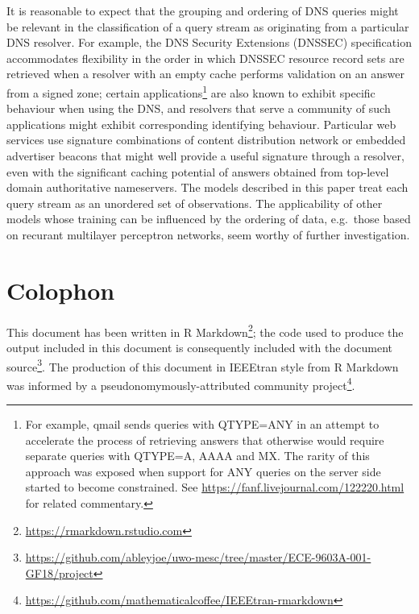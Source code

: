 \documentclass[conference]{IEEEtran}
\begin{document}
It is reasonable to expect that the grouping and ordering of DNS queries
might be relevant in the classification of a query stream as originating
from a particular DNS resolver. For example, the DNS Security Extensions
(DNSSEC) specification\cite{rfc4033} accommodates flexibility in the
order in which DNSSEC resource record sets are retrieved when a resolver
with an empty cache performs validation on an answer from a signed zone;
certain
applications\footnote{For example, qmail sends queries with QTYPE=ANY in an attempt to accelerate the process of retrieving answers that otherwise would require separate queries with QTYPE=A, AAAA and MX. The rarity of this approach was exposed when support for ANY queries on the server side started to become constrained. See \url{https://fanf.livejournal.com/122220.html} for related commentary.}
are also known to exhibit specific behaviour when using the DNS, and
resolvers that serve a community of such applications might exhibit
corresponding identifying behaviour. Particular web services use
signature combinations of content distribution network or embedded
advertiser beacons that might well provide a useful signature through a
resolver, even with the significant caching potential of answers
obtained from top-level domain authoritative nameservers. The models
described in this paper treat each query stream as an unordered set of
observations. The applicability of other models whose training can be
influenced by the ordering of data, e.g.~those based on recurant
multilayer perceptron networks, seem worthy of further investigation.

\section{Colophon}\label{sec:colophon}

\label{sec:colophon}

This document has been written in R
Markdown\footnote{\url{https://rmarkdown.rstudio.com}}; the code used to
produce the output included in this document is consequently included
with the document
source\footnote{\url{https://github.com/ableyjoe/uwo-mesc/tree/master/ECE-9603A-001-GF18/project}}.
The production of this document in IEEEtran style from R Markdown was
informed by a pseudonomymously-attributed community
project\footnote{\url{https://github.com/mathematicalcoffee/IEEEtran-rmarkdown}}.


\end{document}
